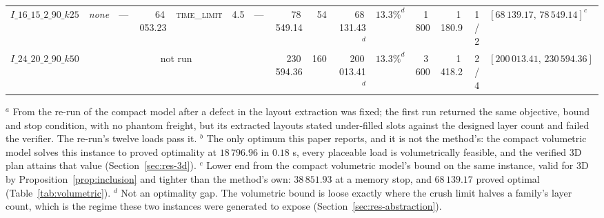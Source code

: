 \begin{table}[!htbp]
{\begin{tabular}{lrrrlrlrrrrrrrl}
$I\_16\_15\_2\_90\_k25$ & \emph{none} & --- & 64\,053.23 & \textsc{time\_limit} & 4.5 & --- & 78\,549.14 & 54 & 68\,131.43$^{d}$ & $13.3\%^{d}$ & 1\,800 & 1\,180.9 & 1 / 2 & $[68\,139.17,\,78\,549.14]^{c}$ \\
$I\_24\_20\_2\_90\_k50$ & \multicolumn{6}{c}{not run} & 230\,594.36 & 160 & 200\,013.41$^{d}$ & $13.3\%^{d}$ & 3\,600 & 1\,418.2 & 2 / 4 & $[200\,013.41,\,230\,594.36]$ \\
\bottomrule
\end{tabular}}
\begin{flushleft}\footnotesize
$^{a}$ From the re-run of the compact model after a defect in the layout
extraction was fixed; the first run returned the same objective, bound
and stop condition, with no phantom freight, but its extracted layouts
stated under-filled slots against the designed layer count and failed
the verifier. The re-run's twelve loads pass it.
$^{b}$ The only optimum this paper reports, and it is not the method's:
the compact volumetric model solves this instance to proved optimality
at $18\,796.96$ in $0.18$ s, every placeable load is volumetrically
feasible, and the verified 3D plan attains that value
(Section~\ref{sec:res-3d}).
$^{c}$ Lower end from the compact volumetric model's bound on the same
instance, valid for 3D by Proposition~\ref{prop:inclusion} and tighter
than the method's own: $38\,851.93$ at a memory stop, and $68\,139.17$
proved optimal (Table~\ref{tab:volumetric}).
$^{d}$ Not an optimality gap. The volumetric bound is loose exactly
where the crush limit halves a family's layer count, which is the regime
these two instances were generated to expose
(Section~\ref{sec:res-abstraction}).
\end{flushleft}
\end{table}

